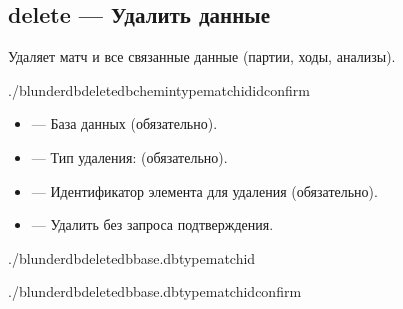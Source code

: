 \documentclass[letterpaper,10pt,russian]{sphinxmanual}
\begin{document}
\subsection{delete — Удалить данные}
\label{\detokenize{cli:delete-supprimer-des-donnees}}
\sphinxAtStartPar
Удаляет матч и все связанные данные (партии, ходы, анализы).

\begin{sphinxVerbatim}[commandchars=\\\{\}]
./blunderdbdelete\PYGZhy{}\PYGZhy{}db\PYGZlt{}chemin\PYGZgt{}\PYGZhy{}\PYGZhy{}typematch\PYGZhy{}\PYGZhy{}id\PYGZlt{}id\PYGZgt{}\PYG{o}{[}\PYGZhy{}\PYGZhy{}confirm\PYG{o}{]}
\end{sphinxVerbatim}

\sphinxAtStartPar
{}
\begin{itemize}
\item {} 
\sphinxAtStartPar
{} — База данных (обязательно).

\item {} 
\sphinxAtStartPar
{} — Тип удаления:  (обязательно).

\item {} 
\sphinxAtStartPar
{} — Идентификатор элемента для удаления (обязательно).

\item {} 
\sphinxAtStartPar
{} — Удалить без запроса подтверждения.

\end{itemize}

\sphinxAtStartPar
{}

\begin{sphinxVerbatim}[commandchars=\\\{\}]
./blunderdbdelete\PYGZhy{}\PYGZhy{}dbbase.db\PYGZhy{}\PYGZhy{}typematch\PYGZhy{}\PYGZhy{}id

./blunderdbdelete\PYGZhy{}\PYGZhy{}dbbase.db\PYGZhy{}\PYGZhy{}typematch\PYGZhy{}\PYGZhy{}id\PYGZhy{}\PYGZhy{}confirm
\end{sphinxVerbatim}
\end{document}
